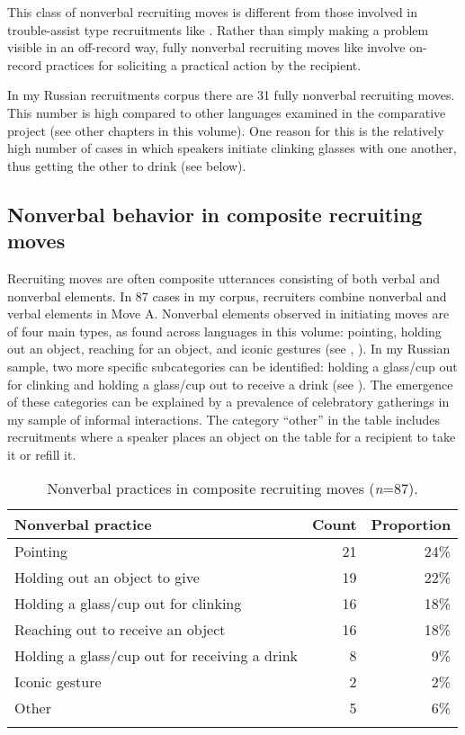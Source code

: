 \documentclass[output=paper,modfonts,nonflat]{langsci/langscibook}
\begin{document}
This class of nonverbal recruiting moves is different from those involved in trouble-assist type recruitments like . Rather than simply making a problem visible in an off-record way, fully nonverbal recruiting moves like  involve on-record practices for soliciting a practical action by the recipient.

In my Russian recruitments corpus there are 31 fully nonverbal recruiting moves. This number is high compared to other languages examined in the comparative project (see other chapters in this volume). One reason for this is the relatively high number of cases in which speakers initiate clinking glasses with one another, thus getting the other to drink (see below).

\subsection{Nonverbal behavior in composite recruiting moves}

Recruiting moves are often composite utterances consisting of both verbal and nonverbal elements. In 87 cases in my corpus, recruiters combine nonverbal and verbal elements in Move A. Nonverbal elements observed in initiating moves are of four main types, as found across languages in this volume: pointing, holding out an object, reaching for an object, and iconic gestures (see , ). In my Russian sample, two more specific subcategories can be identified: holding a glass/cup out for clinking and holding a glass/cup out to receive a drink (see ). The emergence of these categories can be explained by a prevalence of celebratory gatherings in my sample of informal interactions. The category “other” in the table includes recruitments where a speaker places an object on the table for a recipient to take it or refill it.

\begin{table}
\begin{tabularx}{\textwidth}{Xrr}
\lsptoprule
Nonverbal practice & Count & Proportion\\
\midrule
Pointing & 21 & 24\%\\
Holding out an object to give & 19 & 22\%\\
Holding a glass/cup out for clinking & 16 & 18\%\\
Reaching out to receive an object & 16 & 18\%\\
Holding a glass/cup out for receiving a drink & 8 & 9\%\\
Iconic gesture & 2 & 2\%\\
Other & 5 & 6\%\\
\lspbottomrule
\end{tabularx}
\caption{Nonverbal practices in composite recruiting moves (\textit{n}=87).}
\label{tab:baranova:2}
\end{table}
\end{document}
